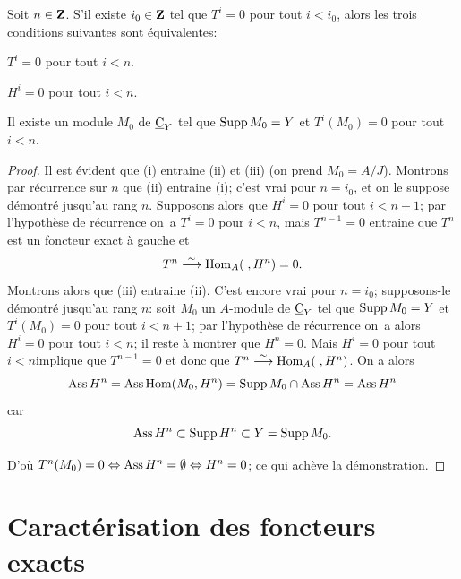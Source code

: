 \begin{theoreme}
\label{IV.1.4} Soit $n\in \mathbf{Z}$. S'il existe $i_{0}\in \mathbf{Z}$ tel que $T^{i}=0$ pour tout $i<i_{0}$, alors les trois conditions suivantes sont \'equivalentes:
\begin{enumeratei}
\item
$T^{i}=0$ pour tout $i<n$.
\item
$H^{i}=0$ pour tout $i<n$.
\item
Il existe un module $M_{0}$ de $\underline{\mathrm{C}}_{Y}$ tel que $\operatorname{Supp} M_{0}=Y$ et $T^{i}(M_{0})=0$ pour tout $i<n$.
\end{enumeratei}
\end{theoreme}

\begin{proof}
Il est \'evident que (i) entraine (ii) et (iii) (on prend $M_{0}=A/J$). Montrons par r\'ecurrence sur $n$ que (ii) entraine (i); c'est vrai pour $n=i_{0}$, et on le suppose d\'emontr\'e jusqu'au rang $n$. Supposons alors que $H^{i}=0$ pour tout $i<n+1$; par l'hypoth\`ese de r\'ecurrence on~a $T^{i}=0$ pour $i<n$, mais $T^{n-1}=0$ entraine que $T^{n}$ est un foncteur exact \`a gauche et
\begin{equation*} T^{n}\overset{\sim}{\longrightarrow}\operatorname{Hom}_{A}(\;, H^{n})=0.
\end{equation*}
Montrons alors que (iii) entraine (ii). C'est encore vrai pour $n=i_{0}$; supposons-le d\'emontr\'e jusqu'au rang $n$: soit $M_{0}$ un $A$-module de $\underline{\mathrm{C}}_{Y}$ tel que $\operatorname{Supp} M_{0}=Y$ et $T^{i}(M_{0})=0$ pour tout $i<n+1$; par l'hypoth\`ese de r\'ecurrence on~a alors $H^{i}=0$ pour tout $i<n$; il reste \`a montrer que $H^{n}=0$. Mais \og $H^{i}=0$ pour tout $i<n$\fg implique que $T^{n-1}=0$ et donc que $T^{n}\overset{\sim}{\longrightarrow}\operatorname{Hom}_{A}(\;, H^{n})$. On a alors
\begin{equation*}
\operatorname{Ass} H^{n}=\operatorname{Ass} \operatorname{Hom}(M_{0}, H^{n})=\operatorname{Supp} M_{0}\cap \operatorname{Ass} H^{n}= \operatorname{Ass} H^{n}
\end{equation*}
car
\begin{equation*}
\operatorname{Ass} H^{n}\subset \operatorname{Supp} H^{n}\subset Y= \operatorname{Supp} M_{0}.
\end{equation*}

D'o\`u $T^{n}(M_{0})=0\Ssi \Ass H^{n}=\emptyset \Ssi H^{n}=0$; ce qui ach\`eve la d\'emonstration.
\skipqed
\end{proof}

\section{Caract\'erisation des foncteurs exacts} \label{IV.2}

